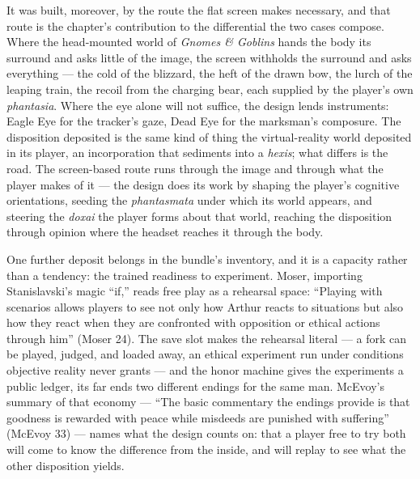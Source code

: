 \documentclass{article}
\begin{document}
It was built, moreover, by the route the flat screen makes necessary, and that route is the chapter's contribution to the differential the two cases compose. Where the head-mounted world of \textit{Gnomes \& Goblins} hands the body its surround and asks little of the image, the screen withholds the surround and asks everything — the cold of the blizzard, the heft of the drawn bow, the lurch of the leaping train, the recoil from the charging bear, each supplied by the player's own \textit{phantasia}. Where the eye alone will not suffice, the design lends instruments: Eagle Eye for the tracker's gaze, Dead Eye for the marksman's composure. The disposition deposited is the same kind of thing the virtual-reality world deposited in its player, an incorporation that sediments into a \textit{hexis}; what differs is the road. The screen-based route runs through the image and through what the player makes of it — the design does its work by shaping the player's cognitive orientations, seeding the \textit{phantasmata} under which its world appears, and steering the \textit{doxai} the player forms about that world, reaching the disposition through opinion where the headset reaches it through the body.

One further deposit belongs in the bundle's inventory, and it is a capacity rather than a tendency: the trained readiness to experiment. Moser, importing Stanislavski's magic ``if,'' reads free play as a rehearsal space: ``Playing with scenarios allows players to see not only how Arthur reacts to situations but also how they react when they are confronted with opposition or ethical actions through him'' (Moser 24). The save slot makes the rehearsal literal — a fork can be played, judged, and loaded away, an ethical experiment run under conditions objective reality never grants — and the honor machine gives the experiments a public ledger, its far ends two different endings for the same man. McEvoy's summary of that economy — ``The basic commentary the endings provide is that goodness is rewarded with peace while misdeeds are punished with suffering'' (McEvoy 33) — names what the design counts on: that a player free to try both will come to know the difference from the inside, and will replay to see what the other disposition yields.
\end{document}
